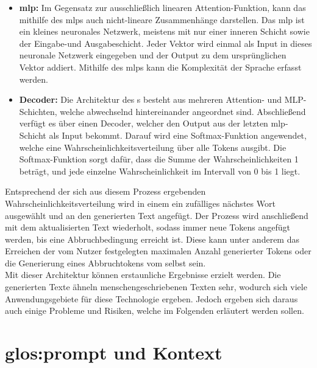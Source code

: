 \documentclass[../main.tex]{subfiles}
\begin{document}
\begin{itemize}
\item \textbf{\acrfull{mlp}:} Im Gegensatz zur ausschließlich linearen Attention-Funktion, kann das  mithilfe des \acrshort{mlp}s auch nicht-lineare Zusammenhänge darstellen. Das \acrshort{mlp} ist ein kleines neuronales Netzwerk, meistens mit nur einer inneren Schicht sowie der Eingabe-und Ausgabeschicht. Jeder Vektor wird einmal als Input in dieses neuronale Netzwerk eingegeben und der Output zu dem ursprünglichen Vektor addiert. Mithilfe des \acrshort{mlp}s kann die Komplexität der Sprache erfasst werden.

\item \textbf{Decoder:} Die Architektur des s besteht aus mehreren Attention- und MLP-Schichten, welche abwechselnd hintereinander angeordnet sind. Abschließend verfügt es über einen Decoder, welcher den Output aus der letzten \acrshort{mlp}-Schicht als Input bekommt. Darauf wird eine Softmax-Funktion angewendet, welche eine Wahrscheinlichkeitsverteilung über alle Tokens ausgibt. Die Softmax-Funktion sorgt dafür, dass die Summe der Wahrscheinlichkeiten 1 beträgt, und jede einzelne Wahrscheinlichkeit im Intervall von 0 bis 1 liegt.\cite{architecture} 
\end{itemize}


Entsprechend der sich aus diesem Prozess ergebenden Wahrscheinlichkeitsverteilung wird in einem  ein zufälliges nächstes Wort ausgewählt und an den generierten Text angefügt. 
Der Prozess wird anschließend mit dem aktualisierten Text wiederholt, sodass immer neue Tokens angefügt werden, bis eine Abbruchbedingung erreicht ist. Diese kann unter anderem das 
Erreichen der vom Nutzer festgelegten maximalen Anzahl generierter Tokens oder die Generierung eines Abbruchtokens vom  selbst sein.\cite{architecture}\\

Mit dieser Architektur können erstaunliche Ergebnisse erzielt werden. Die generierten Texte ähneln menschengeschriebenen Texten sehr, wodurch sich viele Anwendungsgebiete für diese Technologie ergeben. Jedoch ergeben sich daraus auch einige Probleme und Risiken, welche im Folgenden erläutert werden sollen. 

\section{\gls{glos:prompt} und Kontext}
\end{document}
